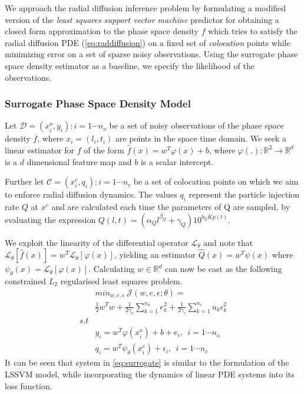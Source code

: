 We approach the radial diffusion inference problem by formulating a
modified version of the \emph{least squares support vector machine}
predictor for obtaining a closed form approximation to the phase space
density $f$ which tries to satisfy the radial diffusion PDE
(\cref{eq:raddiffusion}) on a fixed set of \emph{colocation} points while
minimizing error on a set of sparse noisy observations. 
Using the surrogate phase space density estimator as a baseline, we
specify the likelihood of the observations.


\subsubsection*{Surrogate Phase Space Density Model}

Let $\mathcal{D}={(x^{o}_{i}, y_{i}): i = 1 \cdots n_{o}}$ be a set of
noisy observations of the phase space density $f$, where $x_{i} =
(l_{i}, t_{i})$ are points in the space time domain. We seek a linear
estimator for $f$ of the form $\hat{f}(x) = w^{T}\varphi(x) + b$,
where $\varphi(.): \mathbb{R}^{2} \rightarrow \mathbb{R}^{d}$ is a $d$
dimensional feature map and $b$ is a scalar intercept.

Further let $\mathcal{C} ={(x^{c}_{i}, q_{i}): i = 1 \cdots n_{c}}$ be 
a set of colocation points on which we aim to enforce radial diffusion
dynamics. The values $q_{i}$ represent the particle injection rate $Q$ at $x^c$ and 
are calculated each time the parameters of Q are sampled, by evaluating the expression 
$Q(l,t) = (\alpha_{Q}l^{\beta_{Q}} + \gamma_{Q})10^{b_{Q}Kp(t)}$.

We exploit the linearity of the differential operator
$\mathcal{L}_{\theta}$ and note that $\mathcal{L}_{\theta} [\hat{f}(x)]
= w^{T} \mathcal{L}_{\theta}[\varphi(x)]$, yielding an estimator
$\hat{Q}(x) = w^{T}\psi(x)$ where $\psi_{\theta}(x) =
\mathcal{L}_{\theta}[\varphi(x)]$. Calculating $w \in \mathbb{R}^d$
can now be cast as the following constrained $L_2$ regularised 
least squares problem.
%
\begin{align}\label{eq:surrogate}
   & min_{w,e,\epsilon} \ \mathcal{J}(w,e,\epsilon;\theta) = \\
   & \frac{1}{2} w^{T}w + \frac{1}{2\gamma_{o}} \sum_{k = 1}^{n_{o}}{e^{2}_{k}} + \frac{1}{2\gamma_{c}} \sum_{k = 1}^{n_{c}}{u_{k} \epsilon^{2}_{k}} \\
  s.t &\nonumber \\
  & y_{i}  = w^{T}\varphi(x^{o}_{i}) + b + e_{i}, \ \ i = 1 \cdots n_{o} \\
  & q_{i} = w^{T}\psi_{\theta}(x^{c}_{i}) + \epsilon_{i}, \ \ i = 1 \cdots n_{c}
\end{align}
%
It can be seen that system in \cref{eq:surrogate} is similar to the
formulation of the LSSVM model, while incorporating the dynamics of
linear PDE systems into its loss function. 

